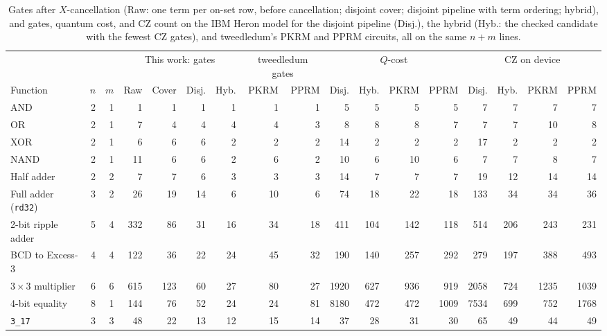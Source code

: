 \documentclass[conference]{IEEEtran}
\theoremstyle{plain}
\begin{document}
\begin{table}[t]
\centering
\caption{Gates after $X$-cancellation (Raw: one term per on-set row, before cancellation; disjoint cover; disjoint
pipeline with term ordering; hybrid), and gates, quantum cost, and CZ count on the IBM Heron model for the
disjoint pipeline (Disj.), the hybrid (Hyb.: the checked candidate with the fewest CZ gates), and tweedledum's
PKRM and PPRM circuits, all on the same $n+m$ lines.}
\label{tab:results}
\footnotesize
\setlength{\tabcolsep}{4pt}
\begin{tabular}{@{}lrr rrrr rr rrrr rrrr@{}}
\toprule
& & & \multicolumn{4}{c}{This work: gates} & \multicolumn{2}{c}{tweedledum gates} & \multicolumn{4}{c}{$Q$-cost} & \multicolumn{4}{c}{CZ on device}\\
\cmidrule(lr){4-7}\cmidrule(lr){8-9}\cmidrule(lr){10-13}\cmidrule(l){14-17}
Function & $n$ & $m$ & Raw & Cover & Disj. & Hyb. & PKRM & PPRM & Disj. & Hyb. & PKRM & PPRM & Disj. & Hyb. & PKRM & PPRM\\
\midrule
AND & 2 & 1 & 1 & 1 & 1 & 1 & 1 & 1 & 5 & 5 & 5 & 5 & 7 & 7 & 7 & 7\\
OR & 2 & 1 & 7 & 4 & 4 & 4 & 4 & 3 & 8 & 8 & 8 & 7 & 7 & 7 & 10 & 8\\
XOR & 2 & 1 & 6 & 6 & 6 & 2 & 2 & 2 & 14 & 2 & 2 & 2 & 17 & 2 & 2 & 2\\
NAND & 2 & 1 & 11 & 6 & 6 & 2 & 6 & 2 & 10 & 6 & 10 & 6 & 7 & 7 & 8 & 7\\
Half adder & 2 & 2 & 7 & 7 & 6 & 3 & 3 & 3 & 14 & 7 & 7 & 7 & 19 & 12 & 14 & 14\\
Full adder (\texttt{rd32}) & 3 & 2 & 26 & 19 & 14 & 6 & 10 & 6 & 74 & 18 & 22 & 18 & 133 & 34 & 34 & 36\\
2-bit ripple adder & 5 & 4 & 332 & 86 & 31 & 16 & 34 & 18 & 411 & 104 & 142 & 118 & 514 & 206 & 243 & 231\\
BCD to Excess-3 & 4 & 4 & 122 & 36 & 22 & 24 & 45 & 32 & 190 & 140 & 257 & 292 & 279 & 197 & 388 & 493\\
$3{\times}3$ multiplier & 6 & 6 & 615 & 123 & 60 & 27 & 80 & 27 & 1920 & 627 & 936 & 919 & 2058 & 724 & 1235 & 1039\\
4-bit equality & 8 & 1 & 144 & 76 & 52 & 24 & 24 & 81 & 8180 & 472 & 472 & 1009 & 7534 & 699 & 752 & 1768\\
\texttt{3\_17} & 3 & 3 & 48 & 22 & 13 & 12 & 15 & 14 & 37 & 28 & 31 & 30 & 65 & 49 & 44 & 49\\
\bottomrule
\end{tabular}
\end{table}
\end{document}
